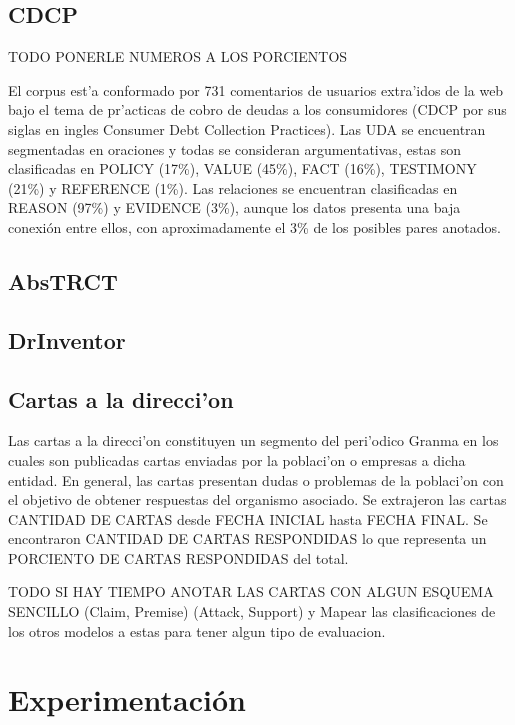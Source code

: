 \subsection{CDCP}\label{corpus:cdcp}

TODO PONERLE NUMEROS A LOS PORCIENTOS

El corpus est'a conformado por 731 comentarios de usuarios extra'idos de la web bajo el tema de 
pr'acticas de cobro de deudas a los consumidores (CDCP por sus siglas en ingles Consumer Debt Collection Practices).
Las UDA se encuentran segmentadas en oraciones y todas se consideran argumentativas, estas son clasificadas en 
POLICY (17\%), VALUE (45\%), FACT (16\%), TESTIMONY (21\%) y REFERENCE (1\%). Las relaciones se encuentran 
clasificadas en REASON (97\%) y EVIDENCE (3\%), aunque los datos presenta una baja conexión entre ellos, con 
aproximadamente el 3\% de los posibles pares anotados.

\subsection{AbsTRCT}

\subsection{DrInventor}

\subsection{Cartas a la direcci'on}

Las cartas a la direcci'on constituyen un segmento del peri'odico Granma en los cuales son publicadas
cartas enviadas por la poblaci'on o empresas a dicha entidad. En general, las cartas 
presentan dudas o problemas de la poblaci'on con el objetivo de obtener respuestas del organismo
asociado. Se extrajeron las cartas CANTIDAD DE CARTAS desde FECHA INICIAL hasta FECHA FINAL. Se encontraron
CANTIDAD DE CARTAS RESPONDIDAS lo que representa un PORCIENTO DE CARTAS RESPONDIDAS del total. 

TODO SI HAY TIEMPO ANOTAR LAS CARTAS CON ALGUN ESQUEMA SENCILLO (Claim, Premise) (Attack, Support) y Mapear 
las clasificaciones de los otros modelos a estas para tener algun tipo de evaluacion.

\section{Experimentación}

